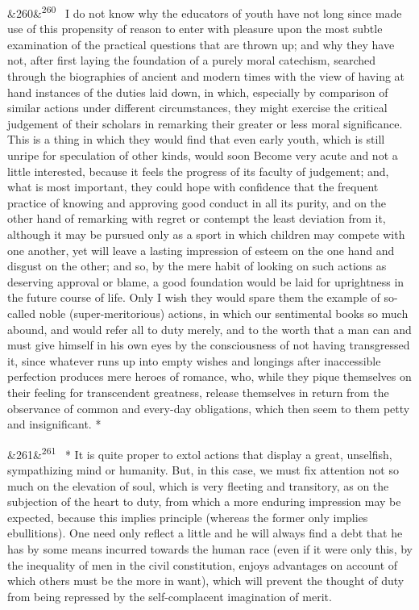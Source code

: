 \documentclass[12pt]{article}
\newcommand{\para}[1][]{\par\noindent\ifx&#1&\else\textsuperscript{\footnotesize #1}~\fi}
\begin{document}
\para[260] I do not know why the educators of youth have not long since made use of this propensity of reason to enter with pleasure upon the most subtle examination of the practical questions that are thrown up; and why they have not, after first laying the foundation of a purely moral catechism, searched through the biographies of ancient and modern times with the view of having at hand instances of the duties laid down, in which, especially by comparison of similar actions under different circumstances, they might exercise the critical judgement of their scholars in remarking their greater or less moral significance. This is a thing in which they would find that even early youth, which is still unripe for speculation of other kinds, would soon Become very acute and not a little interested, because it feels the progress of its faculty of judgement; and, what is most important, they could hope with confidence that the frequent practice of knowing and approving good conduct in all its purity, and on the other hand of remarking with regret or contempt the least deviation from it, although it may be pursued only as a sport in which children may compete with one another, yet will leave a lasting impression of esteem on the one hand and disgust on the other; and so, by the mere habit of looking on such actions as deserving approval or blame, a good foundation would be laid for uprightness in the future course of life. Only I wish they would spare them the example of so-called noble (super-meritorious) actions, in which our sentimental books so much abound, and would refer all to duty merely, and to the worth that a man can and must give himself in his own eyes by the consciousness of not having transgressed it, since whatever runs up into empty wishes and longings after inaccessible perfection produces mere heroes of romance, who, while they pique themselves on their feeling for transcendent greatness, release themselves in return from the observance of common and every-day obligations, which then seem to them petty and insignificant. *

\para[261] * It is quite proper to extol actions that display a great, unselfish, sympathizing mind or humanity. But, in this case, we must fix attention not so much on the elevation of soul, which is very fleeting and transitory, as on the subjection of the heart to duty, from which a more enduring impression may be expected, because this implies principle (whereas the former only implies ebullitions). One need only reflect a little and he will always find a debt that he has by some means incurred towards the human race (even if it were only this, by the inequality of men in the civil constitution, enjoys advantages on account of which others must be the more in want), which will prevent the thought of duty from being repressed by the self-complacent imagination of merit.
\end{document}
